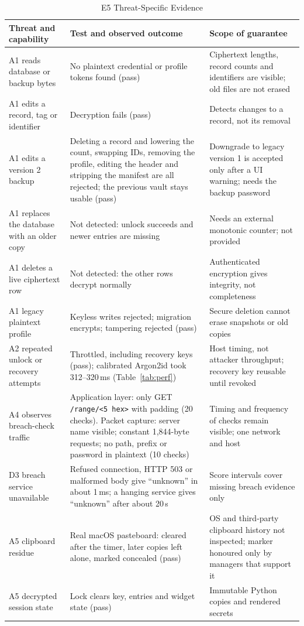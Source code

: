 \documentclass[conference]{IEEEtran}
\begin{document}
\begin{table}[t]
\caption{E5 Threat-Specific Evidence}
\label{tab:sec}
\centering\scriptsize
\begin{tabular}{@{}p{3.2cm}p{7.4cm}p{6.2cm}@{}}
\toprule
Threat and capability & Test and observed outcome & Scope of guarantee\\
\midrule
A1 reads database or backup bytes & No plaintext credential or profile tokens found (pass) & Ciphertext lengths, record counts and identifiers are visible; old files are not erased\\
A1 edits a record, tag or identifier & Decryption fails (pass) & Detects changes to a record, not its removal\\
A1 edits a version 2 backup & Deleting a record and lowering the count, swapping IDs, removing the profile, editing the header and stripping the manifest are all rejected; the previous vault stays usable (pass) & Downgrade to legacy version 1 is accepted only after a UI warning; needs the backup password\\
A1 replaces the database with an older copy & Not detected: unlock succeeds and newer entries are missing & Needs an external monotonic counter; not provided\\
A1 deletes a live ciphertext row & Not detected: the other rows decrypt normally & Authenticated encryption gives integrity, not completeness\\
A1 legacy plaintext profile & Keyless writes rejected; migration encrypts; tampering rejected (pass) & Secure deletion cannot erase snapshots or old copies\\
A2 repeated unlock or recovery attempts & Throttled, including recovery keys (pass); calibrated Argon2id took 312--320\,ms (Table~\ref{tab:perf}) & Host timing, not attacker throughput; recovery key reusable until revoked\\
A4 observes breach-check traffic & Application layer: only GET \texttt{/range/<5 hex>} with padding (20 checks). Packet capture: server name visible; constant 1,844-byte requests; no path, prefix or password in plaintext (10 checks) & Timing and frequency of checks remain visible; one network and host\\
D3 breach service unavailable & Refused connection, HTTP 503 or malformed body give ``unknown'' in about 1\,ms; a hanging service gives ``unknown'' after about 20\,s & Score intervals cover missing breach evidence only\\
A5 clipboard residue & Real macOS pasteboard: cleared after the timer, later copies left alone, marked concealed (pass) & OS and third-party clipboard history not inspected; marker honoured only by managers that support it\\
A5 decrypted session state & Lock clears key, entries and widget state (pass) & Immutable Python copies and rendered secrets\\
\bottomrule
\end{tabular}
\end{table}
\end{document}

